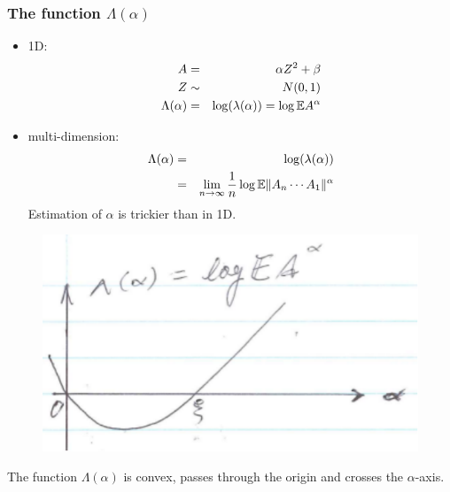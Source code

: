 \documentclass{beamer}
\begin{document}
\begin{frame}
  \frametitle{The function $\Lambda(\alpha)$}
  \begin{minipage}{0.5\linewidth}
    \begin{small}
      \begin{itemize}
      \item 1D:
        \begin{eqnarray*}
          A &=& \alpha Z^2 + \beta \\
          Z &\sim& N(0,1) \\
          \Lambda(\alpha) &=& \log(\lambda(\alpha)) = \log \mathbb{E} A^\alpha          
        \end{eqnarray*}
      \item multi-dimension:
        \begin{eqnarray*}
          \Lambda(\alpha) &=& \log(\lambda(\alpha)) \\
          &=& \lim_{n \to \infty} {1 \over n} \log \mathbb{E} \|A_n \cdots A_1\|^\alpha
        \end{eqnarray*}
        Estimation of $\alpha$ is trickier than in 1D.
      \end{itemize}
    \end{small}
  \end{minipage}\hfill
  \begin{minipage}{0.4\linewidth}
    \begin{figure}
      \centering
      \includegraphics[width=1.0\linewidth]{pic2.pdf}
    \end{figure}
    \begin{scriptsize}
    The function $\Lambda(\alpha)$ is convex, passes through the origin
    and crosses the $\alpha$-axis.
    \end{scriptsize}
  \end{minipage}
\end{frame}
\end{document}
